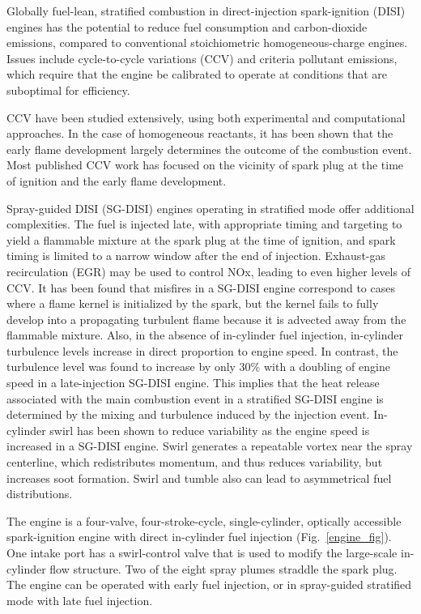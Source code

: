 \documentclass[twocolumn,10pt]{article} %
\begin{document}
Globally fuel-lean, stratified combustion in direct-injection spark-ignition (DISI) engines has the potential to reduce fuel consumption and carbon-dioxide emissions, compared to conventional stoichiometric homogeneous-charge engines. Issues include cycle-to-cycle variations (CCV) and criteria pollutant emissions, which require that the engine be calibrated to operate at conditions that are suboptimal for efficiency.

CCV have been studied extensively, using both experimental and computational approaches. In the case of homogeneous reactants, it has been shown that the early flame development largely determines the outcome of the combustion event. Most published CCV work has focused on the vicinity of spark plug at the time of ignition and the early flame development.

Spray-guided DISI (SG-DISI) engines operating in stratified mode offer additional complexities. The fuel is injected late, with appropriate timing and targeting to yield a flammable mixture at the spark plug at the time of ignition, and spark timing is limited to a narrow window after the end of injection. Exhaust-gas recirculation (EGR) may be used to control NOx, leading to even higher levels of CCV. It has been found that misfires in a SG-DISI engine correspond to cases where a flame kernel is initialized by the spark, but the kernel fails to fully develop into a propagating turbulent flame because it is advected away from the flammable mixture. Also, in the absence of in-cylinder fuel injection, in-cylinder turbulence levels increase in direct proportion to engine speed. In contrast, the turbulence level was found to increase by only 30\% with a doubling of engine speed in a late-injection SG-DISI engine. This implies that the heat release associated with the main combustion event in a stratified SG-DISI engine is determined by the mixing and turbulence induced by the injection event. In-cylinder swirl has been shown to reduce variability as the engine speed is increased in a SG-DISI engine. Swirl generates a repeatable vortex near the spray centerline, which redistributes momentum, and thus reduces variability, but increases soot formation. Swirl and tumble also can lead to asymmetrical fuel distributions.

The engine is a four-valve, four-stroke-cycle, single-cylinder, optically accessible spark-ignition engine with direct in-cylinder fuel injection (Fig.~\ref{engine_fig}). One intake port has a swirl-control valve that is used to modify the large-scale in-cylinder flow structure. Two of the eight spray plumes straddle the spark plug. The engine can be operated with early fuel injection, or in spray-guided stratified mode with late fuel injection.
\end{document}
